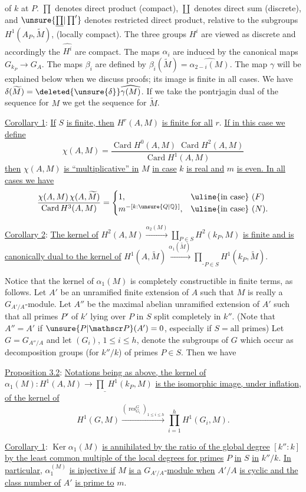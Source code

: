 of $k$ at $P$. $\prod$ denotes direct product (compact), $\coprod$ denotes direct sum (discrete), and $\unsure{\underline{\prod}|\prod'}$ denotes restricted direct product, relative to the subgroups $H^1(A_P,\widetilde M)$, (locally compact). The three groups $H^i$ are viewed as discrete and accordingly the $\widehat{H^i}$ are compact. The maps $\alpha_i$ are induced by the canonical maps $G_{k_P}\longrightarrow G_A$. The maps $\beta_i$ are defined by $\beta_i(\widetilde M)=\widehat{\alpha_{2-i}(M)}$. The map $\gamma$ will be explained below when we discuss proofs; its image is finite in all cases. We have $\delta(\widetilde M)=\deleted{\unsure{\delta}}\widehat{\gamma(M)}$. If we take the pontrjagin dual of the sequence for $M$ we get the sequence for $\widetilde M$.

\uline{Corollary 1}: \uline{If} $S$ \uline{is finite, then} $H^r(A,M)$ \uline{is finite for all} $r$. \uline{If in this case we define}
\[
\chi(A,M)=\frac{\operatorname{Card}H^0(A,M)\;\operatorname{Card}H^2(A,M)}{\operatorname{Card}H^1(A,M)}
\]
\uline{then} $\chi(A,M)$ \uline{is ``multiplicative'' in} $M$  \uline{in case} $k$ \uline{is real and} $m$ \uline{is even. In all cases we have}
\[
\frac{\chi(A,M)\,\chi(A,\widetilde M)}{\operatorname{Card}H^3(A,M)}=
\begin{cases}
1, & \text{\uline{in case} $(F)$}\\
m^{-[k:\unsure{Q|\mathbb Q}]}, & \text{\uline{in case} $(N)$}.
\end{cases}
\]

\uline{Corollary 2}: \uline{The kernel of} $H^2(A,M)\xrightarrow{\alpha_2(M)}\coprod_{P\in S}H^2(k_P,M)$ \uline{is finite and is canonically dual to the kernel of} $H^1(A,\widetilde M)\xrightarrow{\alpha_1(\widetilde M)}\underline{\prod}_{P\in S}H^1(k_P,\widetilde M)$.

Notice that the kernel of $\alpha_1(M)$ is completely constructible in finite terms, as follows. Let $A'$ be an unramified finite extension of $A$ such that $M$ is really a $G_{A'/A}$-module. Let $A''$ be the maximal abelian unramified extension of $A'$ such that all primes $P'$ of $k'$ lying over $P$ in $S$ split completely in $k''$. (Note that $A''=A'$ if $\unsure{P|\mathscr P}(A')=0$, especially if $S=\text{all primes}$) Let $G=G_{A''/A}$ and let $(G_i)$, $1\leq i\leq h$, denote the subgroups of $G$ which occur as decomposition groups (for $k''/k$) of primes $P\in S$. Then we have

\uline{Proposition  3.2}: \uline{Notations being as above, the kernel of} $\alpha_1(M):H^1(A,M)\longrightarrow\underline{\prod}H^1(k_P,M)$ \uline{is the isomorphic image, under inflation, of the kernel of}
\[
H^1(G,M)\xrightarrow{(\operatorname{res}_{G_i}^{G})_{1\leq i\leq h}}\prod_{i=1}^{h}H^1(G_i,M).
\]

\uline{Corollary 1}: $\operatorname{Ker}\alpha_1(M)$ \uline{is annihilated by the ratio of the global degree} $[k'':k]$ \uline{by the least common multiple of the local degrees for primes} $P$ \uline{in} $S$ \uline{in} $k''/k$. \uline{In particular}, $\alpha_1^{(M)}$ \uline{is injective if} $M$ \uline{is a} $G_{A'/A}$-\uline{module when} $A'/A$ \uline{is cyclic and the class number of} $A'$ \uline{is prime to} $m$.
